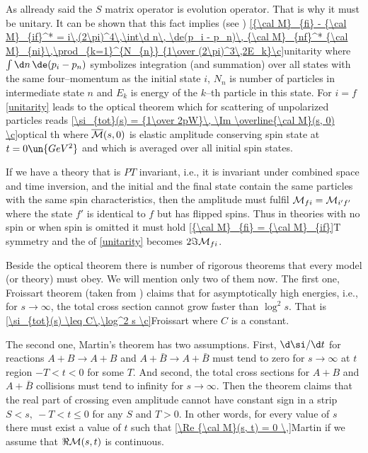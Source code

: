 As allready said the $S$ matrix operator is evolution operator. That is why it must be unitary. It can be shown that this fact implies (see \rf{} )
\eqref{{\cal M}_{fi} - {\cal M}_{if}^* = i\,(2\pi)^4\,\int\d n\, \de(p_i - p_n)\, {\cal M}_{nf}^* {\cal M}_{ni}\,\prod_{k=1}^{N_{n}} {1\over (2\pi)^3\,2E_k}\c}{unitarity}
where $\int\d n\, \de(p_i - p_n)$ symbolizes integration (and summation) over all states with the same four--momentum as the initial state $i$, $N_n$ is number of particles in intermediate state $n$ and $E_k$ is energy of the $k$--th particle in this state. For $i = f$ \equ{} \ref{unitarity} leads to the optical theorem which for scattering of unpolarized particles reads
\eqref{\si_{tot}(s) =  {1\over 2pW}\, \Im \overline{\cal M}(s, 0) \c}{optical th}
where $\overline{\cal M}(s, 0)$ is elastic amplitude conserving spin state at $t=0\un{GeV^2}$ and which is averaged over all initial spin states.

If we have a theory that is $PT$ invariant, i.e., it is invariant under combined space and time inversion, and the initial and the final state contain the same particles with the same spin characteristics, then the amplitude must fulfil ${\cal M}_{fi} = {\cal M}_{i'f'}$ where the state $f'$ is identical to $f$ but has flipped spins. Thus in theories with no spin or when spin is omitted it must hold
\eqref{{\cal M}_{fi} = {\cal M}_{if}}{T symmetry}
and the \lhs{} of \equ{} \ref{unitarity} becomes $2\Im {\cal M}_{fi}$.

Beside the optical theorem there is number of rigorous theorems that every model (or theory) must obey. We will mention only two of them now. The first one, Froissart theorem (taken from ) claims that for asymptotically high energies, i.e., for $s\to\infty$, the total cross section cannot grow faster than $\log^2 s$. That is
\eqref{\si_{tot}(s) \leq C\,\log^2 s \c}{Froissart}
where $C$ is a constant.

The second one, Martin's theorem  has two assumptions. First, $\d\si/\d t$ for reactions $A+B\to A+B$ and $A+\bar B\to A + \bar B$ must tend to zero for $s\to\infty$ at $t$ region $-T < t < 0$ for some $T$. And second, the total cross sections for $A + B$ and $A + \bar B$ collisions must tend to infinity for $s\to\infty$. Then the theorem claims that the real part of crossing even amplitude cannot have constant sign in a strip $S < s,\ -T < t \leq 0$ for any $S$ and $T > 0$. In other words, for every value of $s$ there must exist a value of $t$ such that
\eqref{\Re {\cal M}(s, t) = 0 \,}{Martin}
if we assume that $\Re {\cal M}(s, t)$ is continuous.

